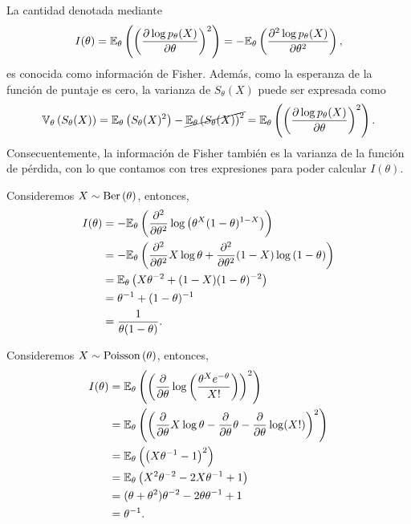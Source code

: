 \begin{definition}
La cantidad denotada mediante  
\begin{equation}
		I(\theta) = \mathbb{E}_\theta \left(\left(\frac{\partial \log   p_\theta(X)}{\partial\theta}\right)^2\right) = 	-\mathbb{E}_\theta \left(\frac{\partial^2 \log   p_\theta(X)}{\partial\theta^2}\right),
\end{equation}	
es conocida como información de Fisher. Además, como la esperanza de la función de puntaje es cero, la varianza de $S_\theta(X)$ puede ser expresada como 
\begin{equation}
	\mathbb{V}_\theta \left(S_\theta(X)\right) = \mathbb{E}_\theta \left(S_\theta(X)^2\right) - \cancel{\mathbb{E}_\theta \left(S_\theta(X)\right)^2} = \mathbb{E}_\theta \left(\left(\frac{\partial \log   p_\theta(X)}{\partial\theta}\right)^2\right).
\end{equation}
Consecuentemente, la información de Fisher también es la varianza de la función de pérdida, con lo que contamos con tres expresiones para poder calcular $I(\theta)$. 
\end{definition}

\begin{exercise}
	Consideremos $X\sim\text{Ber}\left(\theta\right)$, entonces, 
	\begin{align}
		I(\theta) &= -\mathbb{E}_\theta \left(\frac{\partial^2}{\partial\theta^2}\log\left(\theta^X(1-\theta)^{1-X}\right)\right)\nonumber\\
		&= -\mathbb{E}_\theta \left(\frac{\partial^2}{\partial\theta^2} X\log\theta + \frac{\partial^2}{\partial\theta^2} 	(1-X)\log\left(1-\theta\right)	\right)\nonumber\\
		&= \mathbb{E}_\theta \left(X\theta^{-2} + (1-X)(1-\theta)^{-2}	\right)\nonumber\\
		&= \theta^{-1} + (1-\theta)^{-1}	\nonumber\\
		&= 	\frac{1}{\theta(1-\theta)}.
	\end{align}
\end{exercise}

\begin{exercise}
	Consideremos $X\sim\text{Poisson}\left(\theta\right)$, entonces, 
	\begin{align}
		I(\theta) &= \mathbb{E}_\theta \left(\left(\frac{\partial}{\partial\theta}\log\left(\frac{\theta^Xe^{-\theta}}{X!}\right)\right)^2\right)\nonumber	\\
		&= \mathbb{E}_\theta \left(\left( \frac{\partial}{\partial\theta}X\log\theta - \frac{\partial}{\partial\theta}\theta - \frac{\partial}{\partial\theta}\log(X!)\right)^2\right)\nonumber\\
		&= \mathbb{E}_\theta \left(\left( X\theta^{-1} - 1\right)^2\right)\nonumber	\\
		&= \mathbb{E}_\theta \left( X^2\theta^{-2} -2X\theta^{-1}+ 1\right)\nonumber	\\
		&= (\theta+\theta^2)\theta^{-2} -2\theta\theta^{-1}+ 1\nonumber\\
		&= \theta^{-1}.\nonumber	
	\end{align}
\end{exercise}

